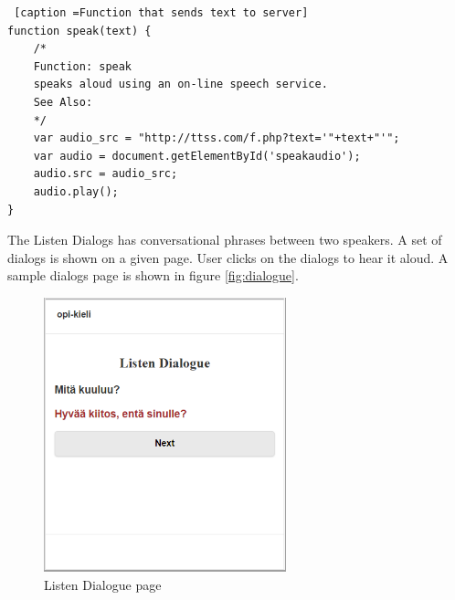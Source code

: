 \documentclass[11pt,a4paper,oneside,article]{memoir}
\begin{document}
\begin{minipage}{\linewidth}
\begin{lstlisting} [caption =Function that sends text to server]
function speak(text) {
    /*
    Function: speak
    speaks aloud using an on-line speech service.
    See Also:						
    */
    var audio_src = "http://ttss.com/f.php?text='"+text+"'";							
    var audio = document.getElementById('speakaudio');
    audio.src = audio_src;
    audio.play();						
}
\end{lstlisting}
\end{minipage}



The Listen Dialogs has conversational phrases between two speakers. A set of dialogs is shown on a given page. User clicks on the dialogs to hear it aloud. A sample dialogs page is shown in figure \vref{fig:dialogue}.

\begin{figure}[h]
\includegraphics[width=7cm]{dialogue}
\caption{Listen Dialogue page}
\label{fig:dialogue}
\end{figure}
\end{document}
